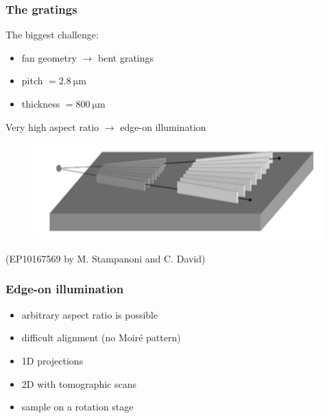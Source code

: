 \documentclass[first,firstsupp]{ETHclass}
\begin{document}
    \begin{frame}
        \frametitle{The gratings}
        The biggest challenge:
        \begin{itemize}
            \item fan geometry $\rightarrow$ bent gratings
            \item pitch $= \SI{2.8}{\micro\metre}$
            \item thickness $= \SI{800}{\micro\metre}$
        \end{itemize}
        Very high aspect ratio $\rightarrow$ edge-on illumination\\
        \begin{figure}[h]
            \centering
            \includegraphics[height=.20\textheight]{edgeon}
        \end{figure}
        \tiny{(EP10167569 by M. Stampanoni and C. David)}
    \end{frame}

    \begin{frame}
        \frametitle{Edge-on illumination}
        \begin{itemize}
            \item arbitrary aspect ratio is possible
            \item difficult alignment (no Moir\'e pattern)
            \item 1D projections
            \item 2D with tomographic scans
            \item sample on a rotation stage
        \end{itemize}
    \end{frame}
\end{document}
